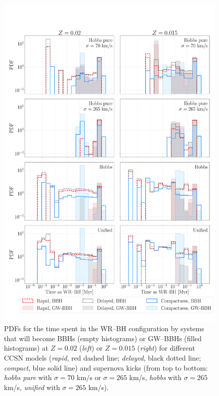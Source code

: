 \documentclass[a4paper,titlepage]{book}     	%
\begin{document}
\begin{appendices}
\begin{figure}
	\centering
	\includegraphics[width=\textwidth]{./images/WRBHtime.pdf}	
	\caption{PDFs for the time spent in the WR--BH configuration by systems that will become BBHs (empty histograms) or GW--BBHs (filled histograms) at $Z=0.02$ (\emph{left}) or $Z=0.015$ (\emph{right}) for different CCSN models (\emph{rapid}, red dashed line; \emph{delayed}, black dotted line; \emph{compact}, blue solid line) and supernova kicks (from top to bottom: \emph{hobbs pure} with $\sigma = 70$ km/s or $\sigma = 265$ km/s, \emph{hobbs} with $\sigma = 265$ km/s, \emph{unified} with $\sigma = 265$ km/s).}\label{fig:resultsWRBH-time}
\end{figure}


\end{appendices}
\end{document}
